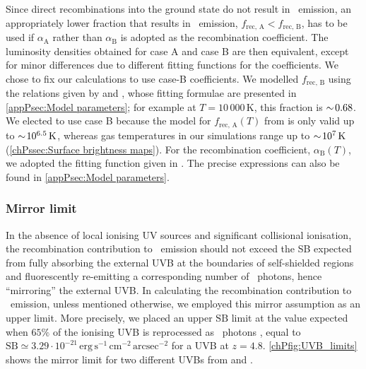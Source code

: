Since direct recombinations into the ground state do not result in \lya\ emission, an appropriately lower fraction that results in \lya\ emission, $f_\text{rec, A} < f_\text{rec, B}$, has to be used if $\alpha_\text{A}$ rather than $\alpha_\text{B}$ is adopted as the recombination coefficient. The luminosity densities obtained for case A and case B are then equivalent, except for minor differences due to different fitting functions for the coefficients. We chose to fix our calculations to use case-B coefficients. We modelled $f_\text{rec, B}$ using the relations given by \citet{2008ApJ...672...48C} and \citet{2014PASA...31...40D}, whose fitting formulae are presented in \cref{appPsec:Model parameters}; for example at $T = 10\,000 \, \mathrm{K}$, this fraction is $\sim \! 0.68$. We elected to use case B because the model for $f_\text{rec, A} (T)$ from \citet{2014PASA...31...40D} is only valid up to $\sim \! 10^{6.5} \, \mathrm{K}$, whereas gas temperatures in our simulations range up to $\sim \! 10^{7} \, \mathrm{K}$ (\cref{chPssec:Surface brightness maps}). For the recombination coefficient, $\alpha_\text{B}(T)$, we adopted the fitting function given in \citet{2011piim.book.....D}. The precise expressions can also be found in \cref{appPsec:Model parameters}.

\subsubsection{Mirror limit}
\label{chPsssec:Mirror limit}

In the absence of local ionising UV sources and significant collisional ionisation, the recombination contribution to \lya\ emission should not exceed the SB expected from fully absorbing the external UVB at the boundaries of self-shielded regions and fluorescently re-emitting a corresponding number of \lya\ photons, hence ``mirroring'' the external UVB. In calculating the recombination contribution to \lya\ emission, unless mentioned otherwise, we employed this mirror assumption as an upper limit. More precisely, we placed an upper $\text{SB}$ limit at the value expected when $65\%$ of the ionising UVB is reprocessed as \lya\ photons \citep[e.g.][]{1996ApJ...468..462G, 2005ApJ...628...61C}, equal to $\text{SB} \simeq 3.29 \cdot 10^{-21} \, \mathrm{erg \, s^{-1} \, cm^{-2} \, arcsec^{-2}}$ for a  UVB at $z=4.8$. \cref{chPfig:UVB_limits} shows the mirror limit for two different UVBs from  and \citet[;  hereafter]{2019MNRAS.485...47P}.

